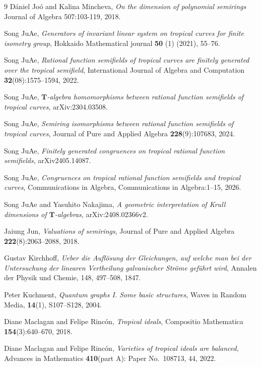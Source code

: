 \documentclass[a4paper,12pt]{amsart}
\begin{document}
\begin{thebibliography}{9}
 D\'aniel Jo\'o and Kalina Mincheva, \textit{On the dimension of polynomial semirings} Journal of Algebra 507:103-119, 2018.

 Song JuAe, \textit{Generators of invariant linear system on tropical curves for finite isometry group}, Hokkaido Mathematical journal \textbf{50} (1) (2021), 55--76.

 Song JuAe, \textit{Rational function semifields of tropical curves are finitely generated over the tropical semifield}, International Journal of Algebra and Computation \textbf{32}(08):1575--1594, 2022.

 Song JuAe, \textit{$\boldsymbol{T}$-algebra homomorphisms between rational function semifields of tropical curves}, arXiv:2304.03508.

 Song JuAe, \textit{Semiring isomorphisms between rational function semifields of tropical curves}, Journal of Pure and Applied Algebra \textbf{228}(9):107683, 2024.

 Song JuAe, \textit{Finitely generated congruences on tropical rational function semifields}, arXiv2405.14087.

 Song JuAe, \textit{Congruences on tropical rational function semifields and tropical curves}, Communications in Algebra, Communications in Algebra:1--15, 2026.

 Song JuAe and Yasuhito Nakajima, \textit{A geometric interpretation of Krull dimensions of $\boldsymbol{T}$-algebras}, arXiv:2408.02366v2.

 Jaiung Jun, \textit{Valuations of semirings}, Journal of Pure and Applied Algebra \textbf{222}(8):2063--2088, 2018.

 Gustav Kirchhoff, \textit{Ueber die Auflösung der Gleichungen, auf welche man bei der Untersuchung der linearen Vertheilung galvanischer Ströme geführt wird}, Annalen der Physik und Chemie, 148, 497--508, 1847.

 Peter Kuchment, \textit{Quantum graphs I. Some basic structures}, Waves in Random Media, \textbf{14}(1), S107--S128, 2004.

 Diane Maclagan and Felipe Rinc\'{o}n, \textit{Tropical ideals}, Compositio Mathematica \textbf{154}(3):640--670, 2018.

 Diane Maclagan and Felipe Rinc\'{o}n, \textit{Varieties of tropical ideals are balanced}, Advances in Mathematics \textbf{410}(part A): Paper No.~108713, 44, 2022.


\end{thebibliography}
\end{document}
